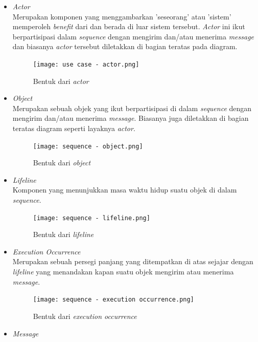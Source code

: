 \documentclass[a4paper]{article}
\begin{document}
\begin{enumerate}
    \begin{itemize}
        \item \textit{Actor}\\
        Merupakan komponen yang menggambarkan 'seseorang' atau 'sistem' memperoleh \textit{benefit} dari dan berada di luar sistem tersebut. \textit{Actor} ini ikut berpartisipasi dalam \textit{sequence} dengan mengirim dan/atau menerima \textit{message} dan biasanya \textit{actor} tersebut diletakkan di bagian teratas pada diagram\autocite{systemanalysisdesign-sequence-diagram}.
        \begin{figure}[h]
            \centering
            \texttt{[image: use case - actor.png]}
            \caption{Bentuk dari \textit{actor}}
        \end{figure}
        \item \textit{Object}\\
        Merupakan sebuah objek yang ikut berpartisipasi di dalam \textit{sequence} dengan mengirim dan/atau menerima \textit{message}. Biasanya juga diletakkan di bagian teratas diagram seperti layaknya \textit{actor}\autocite{systemanalysisdesign-sequence-diagram}.
        \begin{figure}[h]
            \centering
            \texttt{[image: sequence - object.png]}
            \caption{Bentuk dari \textit{object}}
        \end{figure}
        \item \textit{Lifeline}\\
        Komponen yang menunjukkan masa waktu hidup suatu objek di dalam \textit{sequence}\autocite{systemanalysisdesign-sequence-diagram}.
        \begin{figure}[h]
            \centering
            \texttt{[image: sequence - lifeline.png]}
            \caption{Bentuk dari \textit{lifeline}}
        \end{figure}
        \item \textit{Execution Occurrence}\\
        Merupakan sebuah persegi panjang yang ditempatkan di atas sejajar dengan \textit{lifeline} yang menandakan kapan suatu objek mengirim atau menerima \textit{message}\autocite{systemanalysisdesign-sequence-diagram}.
        \begin{figure}[h]
            \centering
            \texttt{[image: sequence - execution occurrence.png]}
            \caption{Bentuk dari \textit{execution occurrence}}
        \end{figure}
        \item \textit{Message}\\

\end{itemize}
\end{enumerate}
\end{document}
